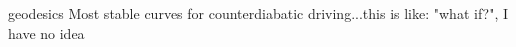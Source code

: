 \chapter*{}
geodesics Most stable curves for counterdiabatic driving...this is like: "what if?", I have no idea